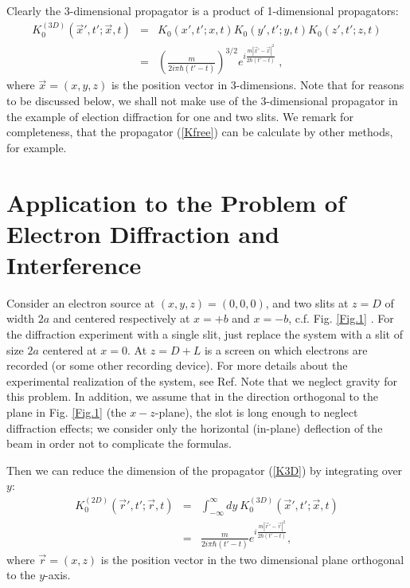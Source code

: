 \documentclass[12pt,aps,prb,preprint]{revtex4-1}   %
\begin{document}
Clearly the 3-dimensional propagator is a product of 1-dimensional propagators:
\begin{eqnarray}\label{K3D}
K_{0}^{(3D)}(\overrightarrow{x}',t';\overrightarrow{x},t)&=&K_0(x',t';x,t)K_0(y',t';y,t)K_0(z',t';z,t)
{}\nonumber\\{}&=&\left(\frac{m}{2i\pi\hbar(t'-t)}\right)^{3/2}
e^{i\frac{m|\overrightarrow{x}'-\overrightarrow{x}|^2}{2\hbar(t'-t)}}\ , 
\end{eqnarray}
where $\overrightarrow{x}=(x,y,z)$ is the position vector in 3-dimensions.
Note that for reasons to be discussed below,
we shall not make use of the 3-dimensional propagator in the example 
of election diffraction for one and two slits. 
We remark for completeness, that the propagator (\ref{Kfree})
can be calculate by other methods, for example.\cite{Kleinert}


\section{Application to the Problem of Electron Diffraction and Interference}

Consider an electron source at $(x,y,z) = (0,0,0)$, and two slits
at $z=D$ of width $2a$ and centered respectively at $x=+b$ and
$x=-b$, c.f. Fig. \ref{Fig.1} . For the diffraction experiment with
a single slit, just replace the system with a slit of size $ 2a $
centered at $x=0$. At $ z = D + L $ is a screen on which electrons
are recorded (or some other recording device). For more details
about the experimental realization of the system, see Ref. \cite{Frabboni} 
Note that we neglect gravity for this
problem. In addition, we assume that in the direction orthogonal
to the plane in Fig. \ref{Fig.1} (the $x-z$-plane), the slot is long
enough to neglect diffraction effects; we consider only the
horizontal (in-plane) deflection of the beam in order not to
complicate the formulas. 

Then we can reduce the dimension of the propagator (\ref{K3D}) by integrating over $y$:
\begin{eqnarray}\label{K2D}
K_{0}^{(2D)}(\overrightarrow{r}',t';\overrightarrow{r},t)&=&
\int_{-\infty}^{\infty}dy\ K_{0}^{(3D)}(\overrightarrow{x}',t';\overrightarrow{x},t)
{}\nonumber\\{}&=&\frac{m}{2i\pi\hbar(t'-t)}
e^{i\frac{m|\overrightarrow{r}'-\overrightarrow{r}|^2}{2\hbar(t'-t)}},  
\end{eqnarray}
where $\overrightarrow{r}=(x,z)$ is the position vector in the two dimensional plane orthogonal to the $y$-axis.
\end{document}
